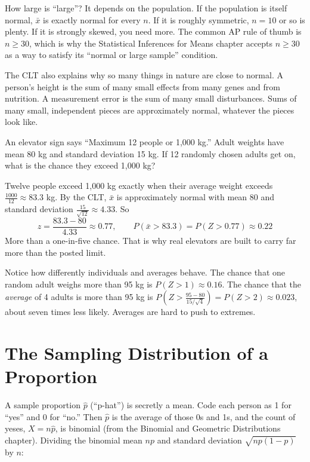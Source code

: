 How large is ``large''? It depends on the population. If the population is itself
normal, $\bar{x}$ is exactly normal for every $n$. If it is roughly symmetric, $n = 10$ or
so is plenty. If it is strongly skewed, you need more. The common AP rule of thumb is
$n \geq 30$, which is why the Statistical Inferences for Means chapter accepts $n \geq 30$
as a way to satisfy its ``normal or large sample'' condition.

The CLT also explains why so many things in nature are close to normal. A person's
height is the sum of many small effects from many genes and from nutrition. A
measurement error is the sum of many small disturbances. Sums of many small,
independent pieces are approximately normal, whatever the pieces look like.

\begin{Worked}
\begin{Problem}
An elevator sign says ``Maximum 12 people or 1,000 kg.'' Adult weights
have mean 80 kg and standard deviation 15 kg. If 12 randomly chosen adults get on, what
is the chance they exceed 1,000 kg?
\end{Problem}
\begin{Solution}
Twelve people exceed 1,000 kg exactly when their average weight
exceeds $\frac{1000}{12} \approx 83.3$ kg. By the CLT, $\bar{x}$ is approximately normal with
mean 80 and standard deviation $\frac{15}{\sqrt{12}} \approx 4.33$. So
$$z = \frac{83.3 - 80}{4.33} \approx 0.77, \qquad P(\bar{x} > 83.3) = P(Z > 0.77) \approx 0.22$$
More than a one-in-five chance. That is why real elevators are built to carry far more than
the posted limit.
\end{Solution}
\end{Worked}

Notice how differently individuals and averages behave. The chance that one random adult
weighs more than 95 kg is $P(Z > 1) \approx 0.16$. The chance that the \emph{average} of 4
adults is more than 95 kg is $P\left(Z > \frac{95 - 80}{15/\sqrt{4}}\right) = P(Z > 2) \approx 0.023$,
about seven times less likely. Averages are hard to push to extremes.

\section{The Sampling Distribution of a Proportion}
A sample proportion $\hat{p}$ (``p-hat'') is secretly a mean. Code each person as 1 for
``yes'' and 0 for ``no.'' Then $\hat{p}$ is the average of those 0s and 1s, and the
count of yeses, $X = n\hat{p}$, is binomial (from the Binomial and Geometric Distributions
chapter). Dividing the binomial mean $np$ and standard deviation $\sqrt{np(1-p)}$ by $n$:

